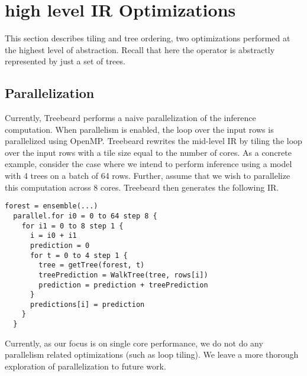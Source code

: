 \section{high level IR Optimizations}
This section describes tiling and tree ordering, two optimizations performed at the highest level of abstraction. Recall that here the  operator is abstractly represented by just a set of trees. 







\subsection{Parallelization}
Currently, Treebeard performs a naive parallelization of the inference computation. When parallelism is enabled, the 
loop over the input rows is parallelized using OpenMP. Treebeard rewrites 
the mid-level IR by tiling the loop over the input rows with a tile size equal to the number of cores. 
As a concrete example, consider the case where we intend to perform inference using a model with 4 trees 
on a batch of 64 rows. Further, assume that we wish to parallelize this computation across 8 cores. 
Treebeard then generates the following IR.
\begin{lstlisting}[style=c++]
  forest = ensemble(...)
  parallel.for i0 = 0 to 64 step 8 {
    for i1 = 0 to 8 step 1 {
      i = i0 + i1
      prediction = 0
      for t = 0 to 4 step 1 {
        tree = getTree(forest, t) 
        treePrediction = WalkTree(tree, rows[i])
        prediction = prediction + treePrediction
      }
      predictions[i] = prediction
    }
  }
\end{lstlisting}
Currently, as our focus is on single core performance, we do not 
do any parallelism related optimizations (such as loop tiling). We leave a more thorough exploration of parallelization 
to future work.